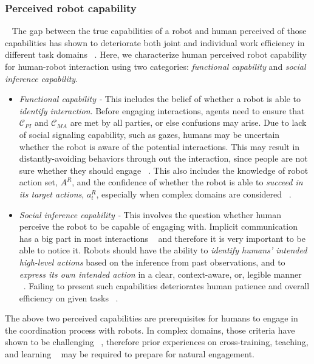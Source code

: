 \documentclass[letterpaper, 10 pt, conference]{ieeeconf}  %
\begin{document}
\subsubsection{Perceived robot capability}~\label{sec:perceived}
The gap between the true capabilities of a robot and human perceived of those capabilities has shown to deteriorate both joint and individual work efficiency in different task domains ~\cite{dragan2015effects}. Here, we characterize human perceived robot capability for human-robot interaction using two categories: \textit{functional capability} and \textit{social inference capability}.

\begin{itemize}
	\item \textit{Functional capability - } This includes the belief of whether a robot is able to \textit{identify interaction}. Before engaging interactions, agents need to ensure that $\mathcal{C}_{PI}$ and $\mathcal{C}_{MA}$ are met by all parties, or else confusions may arise. Due to lack of social signaling capability, such as gazes, humans may be uncertain whether the robot is aware of the potential interactions. This may result in distantly-avoiding behaviors through out the interaction, since people are not sure whether they should engage ~\cite{dragan2015effects}. This also includes the knowledge of robot action set, $A^R$, and the confidence of whether the robot is able to \textit{succeed in its target actions}, $a^R_t$, especially when complex domains are considered ~\cite{chen2018planning}. 
	\item \textit{Social inference capability - } This involves the question whether human perceive the robot to be capable of engaging with. Implicit communication has a big part in most interactions ~\cite{knepper2017implicit} and therefore it is very important to be able to notice it. Robots should have the ability to \textit{identify humans' intended high-level actions} based on the inference from past observations, and to \textit{express its own intended action} in a clear, context-aware, or, legible manner ~\cite{dragan2013legibility}. Failing to present such capabilities deteriorates human patience and overall efficiency on given tasks ~\cite{cha2015perceived}. 
\end{itemize}

The above two perceived capabilities are prerequisites for humans to engage in the coordination process with robots. In complex domains, those criteria have shown to be challenging ~\cite{knepper2017implicit}, therefore prior experiences on cross-training, teaching, and learning ~\cite{zhang2017plan} may be required to prepare for natural engagement. 
\end{document}
